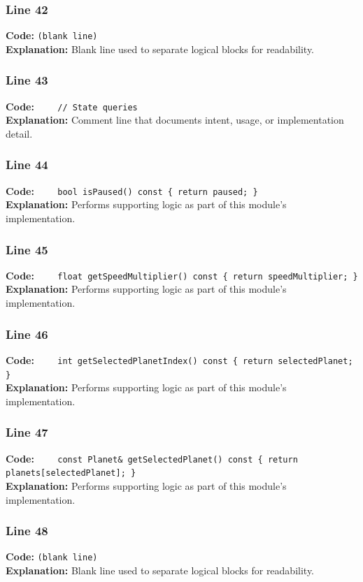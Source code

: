 \documentclass[11pt,a4paper]{article}
\begin{document}
\subsubsection*{Line 42}
\textbf{Code:} \texttt{(blank line)}\\
\textbf{Explanation:} Blank line used to separate logical blocks for readability.

\subsubsection*{Line 43}
\textbf{Code:} \verb|    // State queries|\\
\textbf{Explanation:} Comment line that documents intent, usage, or implementation detail.

\subsubsection*{Line 44}
\textbf{Code:} \verb|    bool isPaused() const { return paused; }|\\
\textbf{Explanation:} Performs supporting logic as part of this module's implementation.

\subsubsection*{Line 45}
\textbf{Code:} \verb|    float getSpeedMultiplier() const { return speedMultiplier; }|\\
\textbf{Explanation:} Performs supporting logic as part of this module's implementation.

\subsubsection*{Line 46}
\textbf{Code:} \verb|    int getSelectedPlanetIndex() const { return selectedPlanet; }|\\
\textbf{Explanation:} Performs supporting logic as part of this module's implementation.

\subsubsection*{Line 47}
\textbf{Code:} \verb|    const Planet& getSelectedPlanet() const { return planets[selectedPlanet]; }|\\
\textbf{Explanation:} Performs supporting logic as part of this module's implementation.

\subsubsection*{Line 48}
\textbf{Code:} \texttt{(blank line)}\\
\textbf{Explanation:} Blank line used to separate logical blocks for readability.
\end{document}
